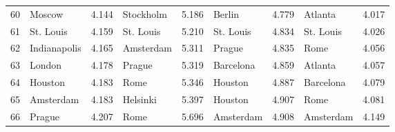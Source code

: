 \documentclass[svgnames,a4paper,final,notitlepage,10pt]{article}
\begin{document}
\begin{center}
\begin{tabular}{llrlrlrlr}
60 &       Moscow &        4.144 &      Stockholm &         5.186 &         Berlin &              4.779 &                     Atlanta &         4.017 \\
61 &    St. Louis &        4.159 &      St. Louis &         5.210 &         St. Louis &           4.834 &                   St. Louis &         4.026 \\
62 & Indianapolis &        4.165 &      Amsterdam &         5.311 &         Prague &              4.835 &                        Rome &         4.056 \\
63 &       London &        4.178 &         Prague &         5.319 &         Barcelona &           4.859 &                     Atlanta &         4.057 \\
64 &      Houston &        4.183 &           Rome &         5.346 &         Houston &             4.887 &                   Barcelona &         4.079 \\
65 &    Amsterdam &        4.183 &       Helsinki &         5.397 &         Houston &             4.907 &                        Rome &         4.081 \\
66 &       Prague &        4.207 &           Rome &         5.696 &         Amsterdam &           4.908 &                   Amsterdam &         4.149 \\
\bottomrule
\end{tabular}
\end{center}
\end{document}
